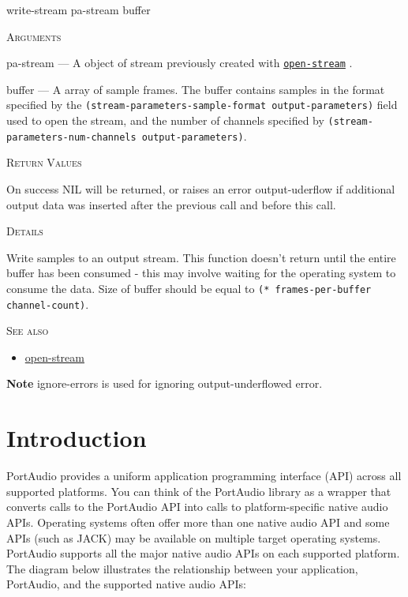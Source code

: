 \documentclass[a4paper]{report}
\begin{document}
    \label{portaudio__fun__write-stream}
    \begin{defun}[Function]
    write-stream pa-stream buffer


    
    \bigskip
    \textsc{Arguments}

pa-stream
	--- A object of stream previously created with \hyperref[portaudio__fun__open-stream]{\texttt{open-stream}}
  .

buffer
	--- A array of sample frames. The buffer contains samples in the format specified by the \texttt{(stream-parameters-sample-format output-parameters)} field used to open the stream, and the number of channels specified by \texttt{(stream-parameters-num-channels output-parameters)}.




    
    \bigskip
    \textsc{Return Values}


On success NIL will be returned, or raises an error output-uderflow if additional output data was inserted after the previous call and before this call. 


	
    \bigskip
    \textsc{Details}

Write samples to an output stream. This function doesn't return until the entire buffer has been consumed - this may involve waiting for the operating system to consume the data. Size of buffer should be equal to \texttt{(* frames-per-buffer channel-count)}.






      
    \bigskip
    \textsc{See also}


	
    \begin{itemize}
    
	  
    \item
    \hyperref[portaudio__fun__open-stream]{open-stream}
    
	
    \end{itemize}
  
      


    
    \end{defun}
  
  

\textbf{Note}
ignore-errors is used for ignoring output-underflowed error.

\section{Introduction} \label{d0d0e0e0e0e2}
PortAudio provides a uniform application programming interface (API) across all supported platforms. You can think of the PortAudio library as a wrapper that converts calls to the PortAudio API into calls to platform-specific native audio APIs. Operating systems often offer more than one native audio API and some APIs (such as JACK) may be available on multiple target operating systems. PortAudio supports all the major native audio APIs on each supported platform. The diagram below illustrates the relationship between your application, PortAudio, and the supported native audio APIs:
\end{document}
